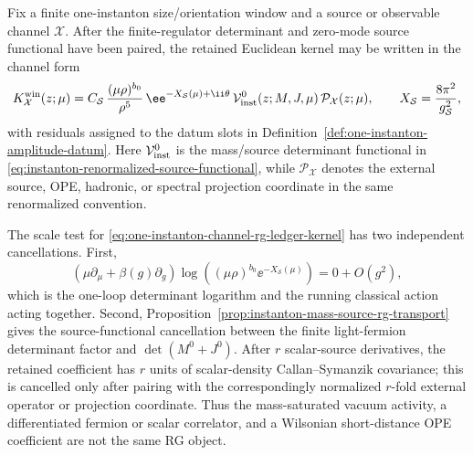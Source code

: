 \begin{controlledapproximation}
\label{ca:one-instanton-channel-rg-ledger}
Fix a finite one-instanton size/orientation window and a source or observable
channel \(\mathcal X\).  After the finite-regulator determinant and zero-mode
source functional have been paired, the retained Euclidean kernel may be
written in the channel form
\begin{equation}
  K_{\mathcal X}^{\rm win}(z;\mu)
  =
  C_{\mathcal S}\,
  \frac{(\mu\rho)^{b_0}}{\rho^5}\,
  \ee^{-X_{\mathcal S}(\mu)+\ii\theta}\,
  \mathcal V_{\rm inst}^{0}(z;M,J,\mu)\,
  \mathcal P_{\mathcal X}(z;\mu),
  \qquad
  X_{\mathcal S}=\frac{8\pi^2}{g_{\mathcal S}^2},
  \label{eq:one-instanton-channel-rg-ledger-kernel}
\end{equation}
with residuals assigned to the datum slots in
Definition~\ref{def:one-instanton-amplitude-datum}.  Here
\(\mathcal V_{\rm inst}^{0}\) is the mass/source determinant functional in
\eqref{eq:instanton-renormalized-source-functional}, while
\(\mathcal P_{\mathcal X}\) denotes the external source, OPE, hadronic, or
spectral projection coordinate in the same renormalized convention.

The scale test for \eqref{eq:one-instanton-channel-rg-ledger-kernel} has two
independent cancellations.  First,
\[
  \left(\mu\partial_\mu+\beta(g)\partial_g\right)
  \log\!\left((\mu\rho)^{b_0}\ee^{-X_{\mathcal S}(\mu)}\right)
  =
  0+O(g^2),
\]
which is the one-loop determinant logarithm and the running classical action
acting together.  Second, Proposition~\ref{prop:instanton-mass-source-rg-transport}
gives the source-functional cancellation between the finite light-fermion
determinant factor and \(\det(M^0+J^0)\).  After \(r\) scalar-source
derivatives, the retained coefficient has \(r\) units of scalar-density
Callan--Symanzik covariance; this is cancelled only after pairing with the
correspondingly normalized \(r\)-fold external operator or projection
coordinate.  Thus the mass-saturated vacuum activity, a differentiated
fermion or scalar correlator, and a Wilsonian short-distance OPE coefficient
are not the same RG object.


\end{controlledapproximation}
